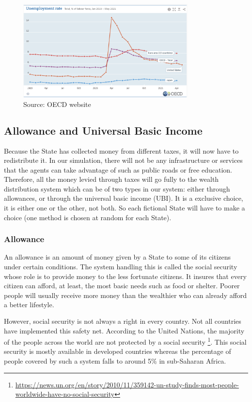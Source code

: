     \begin{figure}[H]
        \centering
        \includegraphics[width=0.8\textwidth]{img/unemployment_OECD.png}
        \caption{Source: OECD website}
        \label{fig:unemployment_oecd}
    \end{figure}



\subsection{Allowance and Universal Basic Income}

Because the State has collected money from different taxes, it will now have to redistribute it. In our simulation, there will not be any infrastructure or services that the agents can take advantage of such as public roads or free education. Therefore, all the money levied through taxes will go fully to the wealth distribution system which can be of two types in our system: either through allowances, or through the universal basic income (UBI). It is a exclusive choice, it is either one or the other, not both. So each fictional State will have to make a choice (one method is chosen at random for each State).

    \subsubsection{Allowance}
    
    An allowance is an amount of money given by a State to some of its citizens under certain conditions. The system handling this is called the social security whose role is to provide money to the less fortunate citizens. It insures that every citizen can afford, at least, the most basic needs such as food or shelter. Poorer people will usually receive more money than the wealthier who can already afford a better lifestyle.
    
    However, social security is not always a right in every country. Not all countries have implemented this safety net. According to the United Nations, the majority of the people across the world are not protected by a social security \footnote{\url{https://news.un.org/en/story/2010/11/359142-un-study-finds-most-people-worldwide-have-no-social-security}}. This social security is mostly available in developed countries whereas the percentage of people covered by such a system falls to around 5\% in sub-Saharan Africa.
    
